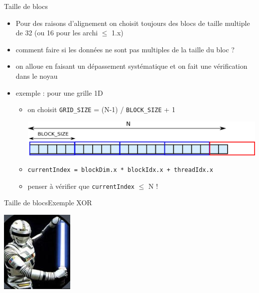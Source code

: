 \documentclass[11pt,mathserif]{beamer}
\newcommand{\scout}{\faAngellist}
\newcommand{\galde}{\faQuestion}
\newcommand{\argi}{\faLightbulbO}
\newcommand{\kontuz}{\faExclamationTriangle}
\newcommand{\egia}{\faCheckCircle}
\begin{document}
\begin{frame}{Taille de blocs}
  \begin{itemize}[<+->]
    \item[\scout] Pour des raisons d'alignement on choisit toujours des blocs de taille multiple de 32 (ou 16 pour les archi $\leqslant$ 1.x)
    \item[\galde] comment faire si les données ne sont pas multiples de la taille du bloc ?
    \item[\argi] on alloue en faisant un dépassement systématique et on fait une vérification dans le noyau
    \item exemple : pour une grille 1D
  \begin{itemize}
    \item[\egia] on choisit \texttt{GRID\_SIZE} = (N-1) / \texttt{BLOCK\_SIZE} + 1
\begin{center}
\includegraphics[width=0.7\linewidth]{fig/grille_1D.eps}
\end{center}
   \item[\egia] \texttt{\small currentIndex = blockDim.x * blockIdx.x + threadIdx.x}
   \item[\kontuz] penser à vérifier que \texttt{currentIndex} $\leq$ N !
 \end{itemize}
  \end{itemize}
\end{frame}

\begin{frame}{Taille de blocs}{Exemple XOR}
\begin{flushright}
\includegraphics[width=0.1\linewidth]{fig/xor.jpg}
\end{flushright}
  
\end{frame}
\end{document}
